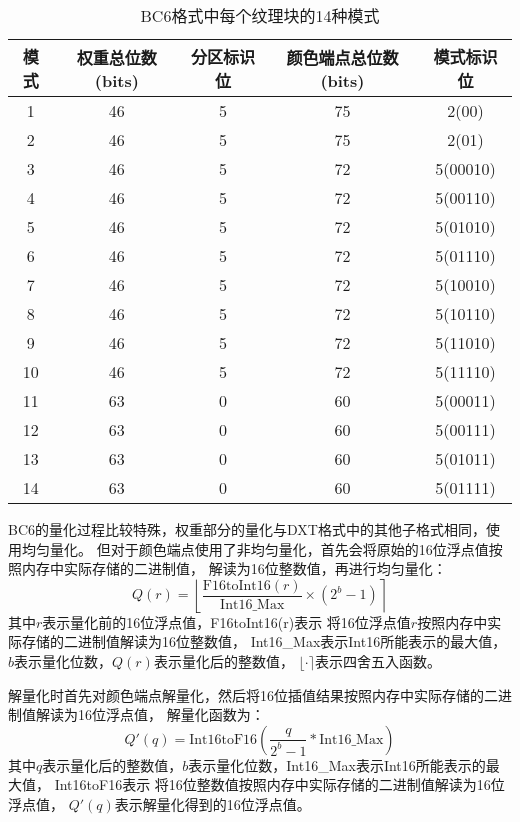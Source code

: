 \begin{table}[htbp]
    \centering
    \caption{BC6格式中每个纹理块的14种模式\cite{BC6H}}
    \label{tab:BC6Mode}        
    \begin{tabular}{ccccc}
    \toprule
    模式 & 权重总位数(bits) & 分区标识位 & 颜色端点总位数(bits) & 模式标识位\\
    \midrule
    1   &   46    &  5  &   75  &   2(00)   \\
    2   &   46    &  5  &   75  &   2(01)   \\
    3   &   46    &  5  &   72  &   5(00010)   \\
    4   &   46    &  5  &   72  &   5(00110)   \\
    5   &   46    &  5  &   72  &   5(01010)   \\
    6   &   46    &  5  &   72  &   5(01110)   \\
    7   &   46    &  5  &   72  &   5(10010)   \\
    8   &   46    &  5  &   72  &   5(10110)   \\
    9   &   46    &  5  &   72  &   5(11010)   \\
    10  &   46    &  5  &   72  &   5(11110)   \\
    11  &   63    &  0  &   60  &   5(00011)   \\
    12  &   63    &  0  &   60  &   5(00111)   \\
    13  &   63    &  0  &   60  &   5(01011)   \\
    14  &   63    &  0  &   60  &   5(01111)   \\
    \bottomrule
    \end{tabular}
\end{table}

BC6的量化过程比较特殊，权重部分的量化与DXT格式中的其他子格式相同，使用均匀量化。
但对于颜色端点使用了非均匀量化，首先会将原始的16位浮点值按照内存中实际存储的二进制值，
解读为16位整数值，再进行均匀量化：
\begin{equation}
    Q(r)=\left \lfloor \frac{\text{F16toInt16}(r)}{\text{Int16\_Max}} \times (2^{b}-1) \right \rceil
\end{equation}
其中$r$表示量化前的16位浮点值，F16toInt16(r)表示
将16位浮点值$r$按照内存中实际存储的二进制值解读为16位整数值，
Int16\_Max表示Int16所能表示的最大值，
$b$表示量化位数，$Q(r)$表示量化后的整数值，
$\lfloor \cdot \rceil$表示四舍五入函数。

解量化时首先对颜色端点解量化，然后将16位插值结果按照内存中实际存储的二进制值解读为16位浮点值，
解量化函数为：
\begin{equation}\label{eqn-6}
    Q'(q)=\text{Int16toF16}(\frac{q}{2^{b}-1}*\text{Int16\_Max})
\end{equation}
其中$q$表示量化后的整数值，$b$表示量化位数，Int16\_Max表示Int16所能表示的最大值，
Int16toF16表示
将16位整数值按照内存中实际存储的二进制值解读为16位浮点值，
$Q'(q)$表示解量化得到的16位浮点值。



